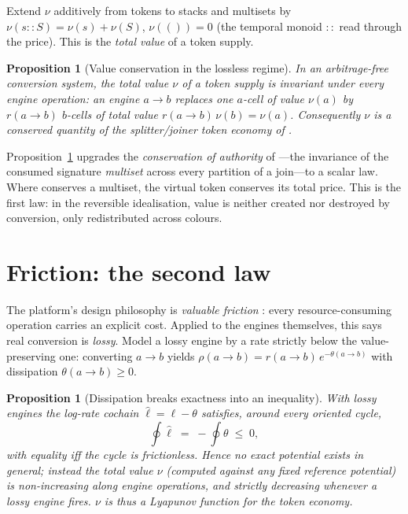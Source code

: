 \documentclass[11pt]{article}
\theoremstyle{definition}
\theoremstyle{plain}
\newtheorem{proposition}[definition]{Proposition}
\theoremstyle{remark}
\begin{document}
Extend $\nu$ additively from tokens to stacks and multisets by
$\nu(s::S)=\nu(s)+\nu(S)$, $\nu(())=0$ (the temporal monoid $::$ read through the price). This is
the \emph{total value} of a token supply.

\begin{proposition}[Value conservation in the lossless regime]\label{prop:first}
In an arbitrage-free conversion system, the total value $\nu$ of a token supply is invariant under
every engine operation: an engine $a\!\to\! b$ replaces one $a$-cell of value $\nu(a)$ by
$r(a\!\to\! b)$ $b$-cells of total value $r(a\!\to\! b)\,\nu(b)=\nu(a)$. Consequently $\nu$ is a
conserved quantity of the splitter/joiner token economy of \cite[App.~A.6]{CARho}.
\end{proposition}

Proposition~\ref{prop:first} upgrades the \emph{conservation of authority} of
\cite[Prop.~4.7]{CARho}---the invariance of the consumed signature \emph{multiset} across every
partition of a join---to a scalar law. Where \cite{CARho} conserves a multiset, the virtual token
conserves its total price. This is the first law: in the reversible idealisation, value is neither
created nor destroyed by conversion, only redistributed across colours.

\section{Friction: the second law}
\label{sec:second}

The platform's design philosophy is \emph{valuable friction} \cite[\S5.3]{CARho}: every
resource-consuming operation carries an explicit cost. Applied to the engines themselves, this says
real conversion is \emph{lossy}. Model a lossy engine by a rate strictly below the value-preserving
one: converting $a\!\to\! b$ yields
$\rho(a\!\to\! b)=r(a\!\to\! b)\,e^{-\theta(a\to b)}$ with dissipation
$\theta(a\!\to\! b)\ge 0$.

\begin{proposition}[Dissipation breaks exactness into an inequality]\label{prop:second}
With lossy engines the log-rate cochain $\hat\ell=\ell-\theta$ satisfies, around every oriented
cycle,
\[
  \oint \hat\ell \;=\; -\oint \theta \;\le\; 0 ,
\]
with equality iff the cycle is frictionless. Hence no exact potential exists in general; instead
the total value $\nu$ (computed against any fixed reference potential) is \emph{non-increasing}
along engine operations, and strictly decreasing whenever a lossy engine fires. $\nu$ is thus a
Lyapunov function for the token economy.
\end{proposition}
\end{document}
